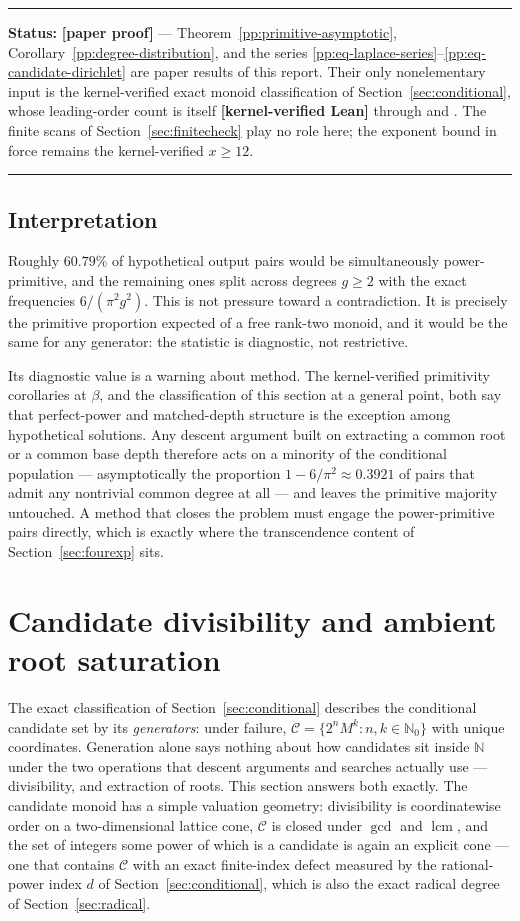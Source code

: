 \documentclass[11pt,oneside]{article}
\theoremstyle{definition}
\theoremstyle{remark}
\newcommand{\N}{\mathbb N}
\newcommand{\Nzero}{\mathbb N_0}
\newcommand{\Cand}{\mathcal C}
\newcommand{\lean}[1]{\texttt{\detokenize{#1}}}
\newcommand{\statuslean}{\textcolor{leanblue}{\textbf{[kernel-verified Lean]}}}
\newcommand{\statusnew}{\textcolor{newgreen}{\textbf{[paper proof]}}}
\newenvironment{statusbox}[1]
{\begin{center}\begin{minipage}{0.94\textwidth}\raggedright\hbadness=10000\hrule
\vspace{0.45em}\textbf{Status:} #1\par\vspace{0.35em}}
{\vspace{0.35em}\hrule\end{minipage}\end{center}}
\begin{document}
\begin{statusbox}{\statusnew{} --- Theorem~\ref{pp:primitive-asymptotic},
Corollary~\ref{pp:degree-distribution}, and the series
\eqref{pp:eq-laplace-series}--\eqref{pp:eq-candidate-dirichlet} are paper results of this
report.  Their only nonelementary input is the kernel-verified exact monoid classification of
Section~\ref{sec:conditional}, whose leading-order count is itself \statuslean{} through
\lean{ExactCounting} and \lean{QuadraticAsymptotic}.  The finite scans of
Section~\ref{sec:finitecheck} play no role here; the exponent bound in force remains the
kernel-verified $x\ge12$.}
\end{statusbox}

\subsection{Interpretation}

Roughly $60.79\%$ of hypothetical output pairs would be simultaneously power-primitive, and
the remaining ones split across degrees $g\ge2$ with the exact frequencies
$6/(\pi^2g^2)$.  This is not pressure toward a contradiction.  It is precisely the primitive
proportion expected of a free rank-two monoid, and it would be the same for any generator: the
statistic is diagnostic, not restrictive.

Its diagnostic value is a warning about method.  The kernel-verified primitivity corollaries at
$\beta$, and the classification of this section at a general point, both say that
perfect-power and matched-depth structure is the exception among hypothetical solutions.  Any
descent argument built on extracting a common root or a common base depth therefore acts on a
minority of the conditional population --- asymptotically the proportion
$1-6/\pi^2\approx0.3921$ of pairs that admit any nontrivial common degree at all --- and
leaves the primitive majority untouched.  A method that closes the problem must engage the
power-primitive pairs directly, which is exactly where the transcendence content of
Section~\ref{sec:fourexp} sits.

\section{Candidate divisibility and ambient root saturation}\label{sec:lattice}

The exact classification of Section~\ref{sec:conditional} describes the conditional candidate
set by its \emph{generators}: under failure, $\Cand=\{2^nM^k:n,k\in\Nzero\}$ with unique
coordinates.  Generation alone says nothing about how candidates sit inside $\N$ under the two
operations that descent arguments and searches actually use --- divisibility, and extraction of
roots.  This section answers both exactly.  The candidate monoid has a simple valuation
geometry: divisibility is coordinatewise order on a two-dimensional lattice cone, $\Cand$ is
closed under $\gcd$ and $\operatorname{lcm}$, and the set of integers some power of which is a
candidate is again an explicit cone --- one that contains $\Cand$ with an exact finite-index
defect measured by the rational-power index $d$ of Section~\ref{sec:conditional}, which is also
the exact radical degree of Section~\ref{sec:radical}.
\end{document}
